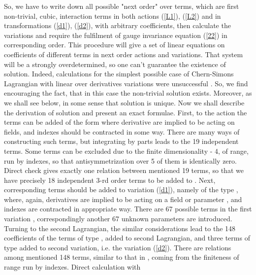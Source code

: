 \documentclass[a4paper,12pt]{article}
\begin{document}
So, we have to write down all possible "next order" over
\coordHE{} terms, which are first non-trivial, cubic,
interaction terms in both actions (\ref{L1}), (\ref{L2}) and in
transformations (\ref{d1}), (\ref{d2}), with arbitrary
coefficients, then calculate the variations and require the
fulfilment of gauge invariance equation (\ref{22}) in
corresponding order. This procedure will give a set of linear
equations on coefficients of different terms in next order actions
and variations. That system will be a strongly overdetermined, so
one can't guarantee the existence of solution. Indeed,
calculations for the simplest possible case of Chern-Simons
Lagrangian with linear over derivatives variations were
unsuccessful \cite{Mkr}. So, we find encouraging the fact, that in
this case the non-trivial solution exists. Moreover, as we shall
see below, in some sense that solution is unique.
    Now we shall describe the derivation of solution and present an
exact formulae.
    First, to the action \coordHE{} the terms can be added of the
form \coordHE{} where derivative are implied to be
acting on fields, and indexes should be contracted in some way.
There are many ways of constructing such terms, but integrating by
parts leads to the 19 independent terms. Some terms can be
excluded due to the finite dimensionality - 4, of range, run by
indexes, so that antisymmetrization over 5 of them is identically
zero. Direct check gives exactly one relation between mentioned 19
terms, so that we have precisely 18 independent 3-rd order terms
to be added to \coordHE{}. Next, corresponding terms should be added
to variation (\ref{d1}), namely of the type \coordHE{}, where, again, derivatives are implied to be
acting on a field \coordHE{} or parameter \myHighlight{$\xi$}\coordHE{}, and indexes are
contracted in appropriate way. There are 67 possible terms in the
first variation \coordHE{}, correspondingly another 67 unknown
parameters are introduced. Turning to the second Lagrangian, the
similar considerations lead to the 148 coefficients of the terms
of type \coordHE{}, added to second
Lagrangian, and three terms of type \coordHE{} added to second
variation, i.e. the variation (\ref{d2}). There are relations
among mentioned 148 terms, similar to that in \coordHE{}, coming from
the finiteness of range run by indexes. Direct calculation with
\end{document}
